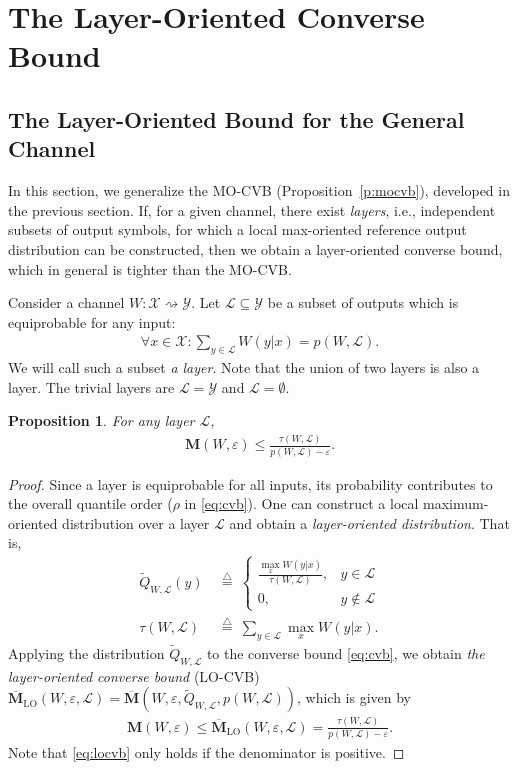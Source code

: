 \documentclass[journal, twocol]{IEEEtran}
\newcommand{\mL}{{\mathcal{L}}}
\newcommand{\bfM}{{\mathbf{M}}}
\newcommand{\obfM}{{\overline{\mathbf{M}}}}
\newcommand{\tQ}{{\widetilde{Q}}}
\newcommand{\mX}{{\mathcal{X}}}
\newcommand{\mY}{{\mathcal{Y}}}
\newcommand{\defeq}{{\overset{\triangle}{=}}}
\newcommand{\ve}{\varepsilon}
\newcommand{\tosq}{\rightsquigarrow}
\newtheorem{proposition}{Proposition}
\begin{document}
\section{The Layer-Oriented Converse Bound}
\label{s:locvb}
\subsection{The Layer-Oriented Bound for the General Channel}

In this section, we generalize the MO-CVB (Proposition~\ref{p:mocvb}), developed in the previous section.
If, for a given channel, there exist \emph{layers}, i.e., independent subsets of output symbols, for which a local max-oriented reference output distribution can be constructed, then we obtain a layer-oriented converse bound, which in general is tighter than the MO-CVB.

Consider a channel $W:\mX \tosq \mY$.
Let $\mL \subseteq \mY$ be a subset of outputs which is equiprobable for any input:
\begin{align}
\forall x\in\mX: \sum_{y\in\mL} W(y|x)=p(W,\mL).
\label{eq:mZi}    
\end{align}
We will call such a subset \emph{a layer}.
Note that the union of two layers is also a layer.
The trivial layers are $\mL=\mY$ and $\mL=\emptyset$.

\begin{proposition}
For any layer $\mL$,   
\begin{align}
\bfM(W,\ve) \leq \frac{\tau(W,\mL)}{p(W,\mL)-\ve}.
\label{eq:locvb}    
\end{align}
\end{proposition}
\begin{proof}
Since a layer is equiprobable for all inputs, its probability contributes to the overall quantile order ($\rho$ in \eqref{eq:cvb}).
One can construct a local maximum-oriented distribution over a layer $\mL$ and obtain a \emph{layer-oriented distribution}.
That is,
\begin{align}
\tQ_{W,\mL}(y)  \ &\defeq \
\begin{cases}
\displaystyle\frac{\max_x W(y|x)}{\tau(W,\mL)}, & y\in \mL   \\
0, & y\notin \mL
\end{cases}
\label{eq:loq}
\\
\tau(W,\mL) \ &\defeq \ \sum_{y \in \mL} \max_x W(y|x).
\end{align}
Applying the distribution $\tQ_{W,\mL}$ to the converse bound \eqref{eq:cvb}, we obtain \emph{the layer-oriented converse bound} (LO-CVB) $\obfM_\text{LO}(W,\ve,\mL)=\obfM(W,\ve,\tQ_{W,\mL},p(W,\mL))$, which is given by
\begin{align}
\bfM(W,\ve) \leq \obfM_\text{LO}(W,\ve,\mL) = \frac{\tau(W,\mL)}{p(W,\mL)-\ve}.
\label{eq:locvb}    
\end{align}
Note that \eqref{eq:locvb} only holds if the denominator is positive.
\end{proof}
\end{document}
